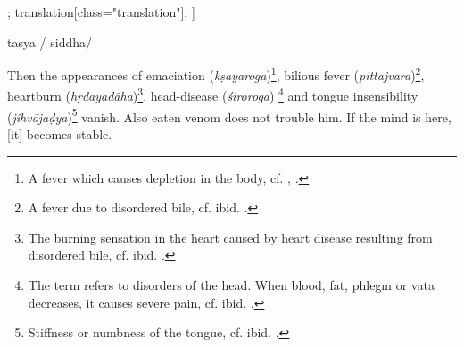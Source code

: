 \begin{alignment}[
  texts=edition[class="edition"];
  translation[class="translation"],
  ]
\begin{edition}
\begin{prose}
tasya
      /
      siddha/
    \end{prose}
  \end{edition}
  \begin{translation}
    \begin{tlate}
      \noindent
      Then the appearances of emaciation (\textit{kṣayaroga})\footnote{A fever which causes depletion in the body, cf.  , \citeauthor[1968: 441-442]{ayurveda}.}, bilious fever (\textit{pittajvara})\footnote{A fever due to disordered bile, cf. ibid. \citeauthor[1968: 618]{ayurveda}.}, heartburn (\textit{hṛdayadāha})\footnote{The burning sensation in the heart caused by heart disease resulting from disordered bile, cf. ibid. \citeauthor[1968: 1721]{ayurveda}.}, head-disease (\textit{śiroroga}) \footnote{The term refers to disorders of the head. When blood, fat, phlegm or vata decreases, it causes severe pain, cf. ibid. \citeauthor[1968: 1452]{ayurveda}.} and tongue insensibility (\textit{jihvājaḍya})\footnote{Stiffness or numbness of the tongue, cf. ibid. \citeauthor[1968: 1452]{ayurveda}.} vanish. Also eaten venom does not trouble him.\textsuperscript{\coro{[\lowroman{10}]}} If the mind is here, [it] becomes stable.

\end{tlate}
\end{translation}
\end{alignment}
